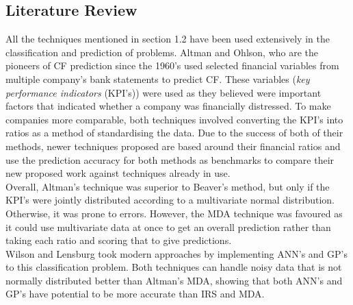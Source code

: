\documentclass[11pt]{article}
\begin{document}
\subsection{Literature Review}
All the techniques mentioned in section 1.2 have been used extensively in the classification and prediction of problems. Altman and Ohlson, who are the pioneers of CF prediction since the 1960's used selected financial variables from multiple company's bank statements to predict CF. These variables (\textit{key performance indicators} (KPI's)) were used as they believed were important factors that indicated whether a company was financially distressed. To make companies more comparable, both techniques involved converting the KPI's into ratios as a method of standardising the data. Due to the success of both of their methods, newer techniques proposed are based around their financial ratios and use the prediction accuracy for both methods as benchmarks to compare their new proposed work against techniques already in use. \\

Overall, Altman's technique was superior to Beaver's method, but only if the KPI's were jointly distributed according to a multivariate normal distribution. Otherwise, it was prone to errors. However, the MDA technique was favoured as it could use multivariate data at once to get an overall prediction rather than taking each ratio and scoring that to give predictions. \\
Wilson and Lensburg took modern approaches by implementing ANN's and GP's to this classification problem. Both techniques can handle noisy data that is not normally distributed better than Altman's MDA, showing that both ANN's and GP's have potential to be more accurate than IRS and MDA. 
\end{document}
